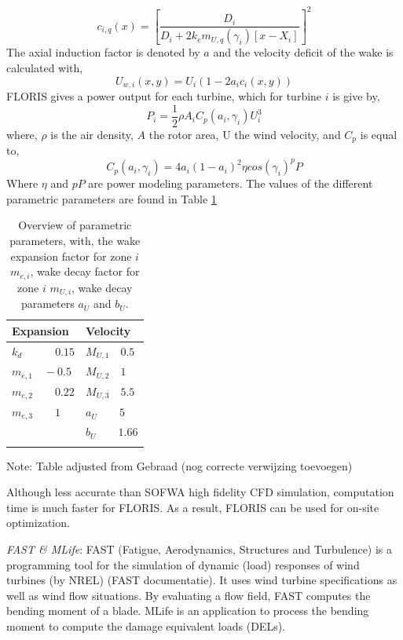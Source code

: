 \begin{equation}
\label{eq:c}
c_{i,q}(x) = \left[ \frac{D_i}{D_i + 2k_em_{U,q}(\gamma_i)[x - X_i]} \right]^2
\end{equation}
The axial induction factor is denoted by $a$ and the velocity deficit of the wake is calculated with,
\begin{equation}
\label{eq:Uw}
U_{w,i}(x,y) = U_i\left( {1-2a_ic_i(x,y)} \right)
\end{equation}
FLORIS gives a power output for each turbine, which for turbine $i$ is give by,
\begin{equation}
\label{eq:P}
P_i = \frac{1}{2} \rho A_i C_p(a_i, \gamma_i)U_i^3
\end{equation}
where, $\rho$ is the air density, $A$ the rotor area, U the wind velocity, and $C_p$ is equal to,
\begin{equation}
\label{eq:Cp}
C_p(a_i, \gamma_i) = 4a_i(1-a_i)^2 \eta cos(\gamma_i)^pP
\end{equation}
Where $\eta$ and $pP$ are power modeling parameters.
The values of the different parametric parameters are found in Table \ref{tab:para}
\begin{table}[h]
	\caption{Overview of parametric parameters, with, the wake expansion factor for zone $i$ $m_{e,i}$, wake decay factor for zone $i$ $m_{U,i}$, wake decay parameters $a_U$ and $b_U$.}
	\centering
	\begin{tabular}{ll}
		\hline
		Expansion & Velocity  \\ 
		\hline
		$k_d \qquad \quad 0.15$ & $M_{U,1} \quad 0.5$ \\
		$m_{e,1} \quad -0.5$ & $M_{U,2} \quad 1$ \\
		$m_{e,2} \qquad 0.22$ & $M_{U,3} \quad 5.5$ \\
		$m_{e,3} \qquad 1$ & $a_U \qquad 5$ \\
		& $b_U \qquad 1.66$ \\
		\hline
		\label{tab:para}
	\end{tabular}
	Note: Table adjusted from Gebraad \cite{Gebraad2016}(nog correcte verwijzing toevoegen)
\end{table}

Although less accurate than  SOFWA high fidelity CFD simulation, computation time is much faster for FLORIS. As a result, FLORIS can be used for on-site optimization. 

\textit{FAST \& MLife}: FAST (Fatigue, Aerodynamics, Structures and Turbulence) is a programming tool for the simulation of dynamic (load) responses of wind turbines (by NREL) (FAST documentatie). It uses wind turbine specifications as well as wind flow situations. By evaluating a flow field, FAST computes the bending moment of a blade. MLife is an application to process the bending moment to compute the damage equivalent loads (DELs). 


